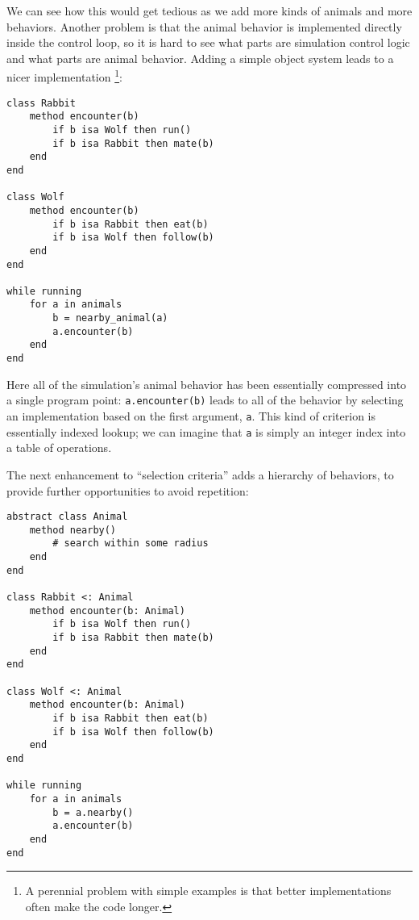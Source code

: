 We can see how this would get tedious as we add more kinds of animals
and more behaviors. Another problem is that the animal behavior is
implemented directly inside the control loop, so it is hard to see
what parts are simulation control logic and what parts are animal
behavior. Adding a simple object system leads to a nicer implementation
\footnote{A perennial problem with simple examples is that better
implementations often make the code longer.}:

\begin{singlespace}
\begin{verbatim}
class Rabbit
    method encounter(b)
        if b isa Wolf then run()
        if b isa Rabbit then mate(b)
    end
end

class Wolf
    method encounter(b)
        if b isa Rabbit then eat(b)
        if b isa Wolf then follow(b)
    end
end

while running
    for a in animals
        b = nearby_animal(a)
        a.encounter(b)
    end
end
\end{verbatim}
\end{singlespace}

Here all of the simulation's animal behavior has been essentially
compressed into a single program point: \texttt{a.encounter(b)}
leads to all of the behavior by selecting an implementation based
on the first argument, \texttt{a}. This kind of criterion is
essentially indexed lookup; we can imagine that \texttt{a} is
simply an integer index into a table of operations.

The next enhancement to ``selection criteria'' adds a hierarchy
of behaviors, to provide further opportunities to avoid
repetition:


\begin{singlespace}
\begin{verbatim}
abstract class Animal
    method nearby()
        # search within some radius
    end
end

class Rabbit <: Animal
    method encounter(b: Animal)
        if b isa Wolf then run()
        if b isa Rabbit then mate(b)
    end
end

class Wolf <: Animal
    method encounter(b: Animal)
        if b isa Rabbit then eat(b)
        if b isa Wolf then follow(b)
    end
end

while running
    for a in animals
        b = a.nearby()
        a.encounter(b)
    end
end
\end{verbatim}
\end{singlespace}

